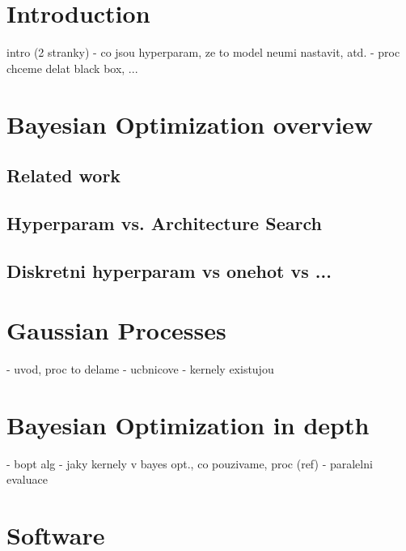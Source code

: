 \chapter{Introduction}

intro (2 stranky)
  - co jsou hyperparam, ze to model neumi nastavit, atd.
  - proc chceme delat black box, ...
\\




\chapter{Bayesian Optimization overview}



\section{Related work}
\section{Hyperparam vs. Architecture Search}
\section{Diskretni hyperparam vs onehot vs ...}


\chapter{Gaussian Processes}

- uvod, proc to delame
- ucbnicove
- kernely existujou
\\




\chapter{Bayesian Optimization in depth}

- bopt alg
- jaky kernely v bayes opt., co pouzivame, proc (ref)
- paralelni evaluace
\\




\chapter{Software}

